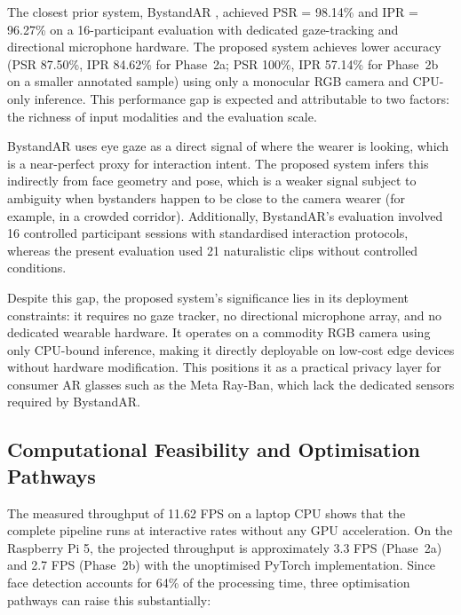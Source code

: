 The closest prior system, BystandAR \cite{bystandar}, achieved PSR = 98.14\% and
IPR = 96.27\% on a 16-participant evaluation with dedicated gaze-tracking and
directional microphone hardware. The proposed system achieves lower accuracy (PSR
87.50\%, IPR 84.62\% for Phase~2a; PSR 100\%, IPR 57.14\% for Phase~2b on a smaller
annotated sample) using only a monocular RGB camera and CPU-only inference. This
performance gap is expected and attributable to two factors: the richness of input
modalities and the evaluation scale.

BystandAR uses eye gaze as a direct signal of where the wearer is looking, which is
a near-perfect proxy for interaction intent. The proposed system infers this
indirectly from face geometry and pose, which is a weaker signal subject to ambiguity
when bystanders happen to be close to the camera wearer (for example, in a crowded
corridor). Additionally, BystandAR's evaluation involved 16 controlled participant
sessions with standardised interaction protocols, whereas the present evaluation used
21 naturalistic clips without controlled conditions.

Despite this gap, the proposed system's significance lies in its deployment
constraints: it requires no gaze tracker, no directional microphone array, and no
dedicated wearable hardware. It operates on a commodity RGB camera using only
CPU-bound inference, making it directly deployable on low-cost edge devices without
hardware modification. This positions it as a practical privacy layer for consumer
AR glasses such as the Meta Ray-Ban, which lack the dedicated sensors required by
BystandAR.

\subsection{Computational Feasibility and Optimisation Pathways}
\label{sec:disc_fps}

The measured throughput of 11.62 FPS on a laptop CPU shows that the complete
pipeline runs at interactive rates without any GPU acceleration. On the Raspberry Pi 5,
the projected throughput is approximately 3.3 FPS (Phase~2a) and 2.7 FPS (Phase~2b)
with the unoptimised PyTorch implementation. Since face detection accounts for 64\% of
the processing time, three optimisation pathways can raise this substantially:

